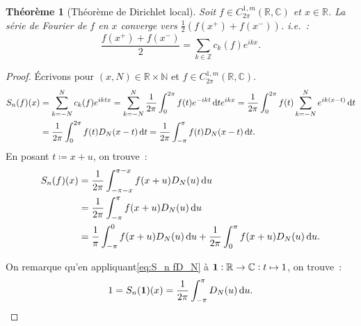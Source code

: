 \documentclass{report}
\newtheorem{thm}{Théorème}[chapter]
\theoremstyle{definition}
\theoremstyle{remark}
\numberwithin{equation}{section}
\newcommand{\C}{\mathbb C}
\newcommand{\R}{\mathbb R}
\newcommand{\Z}{\mathbb Z}
\newcommand{\N}{\mathbb N}
\begin{document}
			\begin{thm}[Théorème de Dirichlet local]\label{thm:Dirichlet local} Soit $f \in C^{1,m}_{2\pi}(\R, \C)$ et $x \in \R$. La série de Fourier de $f$ en $x$
			converge vers $\frac 12(f(x^+) + f(x^-))$. i.e.~:
			\begin{equation}
				\frac {f(x^+) + f(x^-)}2 = \sum_{k \in \Z}c_k(f)e^{ikx}.
			\end{equation}
			\end{thm}

			\begin{proof} Écrivons pour $(x, N) \in \R \times \N$ et $f \in C^{1,m}_{2\pi}(\R, \C)$.
			\begin{align}
				S_n(f)(x) &= \sum_{k=-N}^Nc_k(f)e^{iktx} = \sum_{k=-N}^N\frac 1{2\pi}\int_0^{2\pi}f(t)e^{-ikt}\dif te^{ikx} = \frac 1{2\pi}\int_0^{2\pi}f(t)\sum_{k=-N}^Ne^{ik(x-t)}\dif t \\
				&= \frac 1{2\pi}\int_0^{2\pi}f(t)D_N(x-t)\dif t = \frac 1{2\pi}\int_{-\pi}^{\pi}f(t)D_N(x-t)\dif t.
			\end{align}
			En posant $t \coloneqq x+u$, on trouve~:
			\begin{align}
				S_n(f)(x) &= \frac 1{2\pi}\int_{-\pi-x}^{\pi-x}f(x+u)D_N(u)\dif u  \\
					&= \frac 1{2\pi}\int_{-\pi}^{\pi}f(x+u)D_N(u)\dif u \label{eq:S_n fD_N}\\
					&= \frac 1{\pi}\int_{-\pi}^0 f(x+u)D_N(u)\dif u + \frac 1{2\pi}\int_0^\pi f(x+u)D_N(u)\dif u.
			\end{align}

			On remarque qu'en appliquant\eqref{eq:S_n fD_N} à ${\bf 1} : \R \to \C : t \mapsto 1$, on trouve~:
			\begin{equation}
				1 = S_n({\bf 1})(x) = \frac 1{2\pi}\int_{-\pi}^\pi D_N(u)\dif u.
			\end{equation}


\end{proof}
\end{document}

